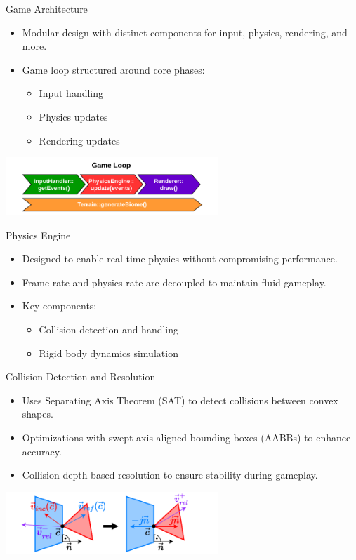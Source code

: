 \documentclass{beamer}
\begin{document}
\begin{frame}{Game Architecture}
    \begin{itemize}
        \item Modular design with distinct components for input, physics, rendering, and more.
        \item Game loop structured around core phases:
        \begin{itemize}
            \item Input handling
            \item Physics updates
            \item Rendering updates
        \end{itemize}
    \end{itemize}
    \centering
    \includegraphics[width=0.6\textwidth]{../figures/physics/gameLoop.pdf} %
\end{frame}

\begin{frame}{Physics Engine}
    \begin{itemize}
        \item Designed to enable real-time physics without compromising performance.
        \item Frame rate and physics rate are decoupled to maintain fluid gameplay.
        \item Key components:
        \begin{itemize}
            \item Collision detection and handling
            \item Rigid body dynamics simulation
        \end{itemize}
    \end{itemize}
\end{frame}

\begin{frame}{Collision Detection and Resolution}
    \begin{itemize}
        \item Uses Separating Axis Theorem (SAT) to detect collisions between convex shapes.
        \item Optimizations with swept axis-aligned bounding boxes (AABBs) to enhance accuracy.
        \item Collision depth-based resolution to ensure stability during gameplay.
    \end{itemize}
    \centering
    \includegraphics[width=0.6\textwidth]{../figures/physics/resolution.pdf} %
\end{frame}
\end{document}
